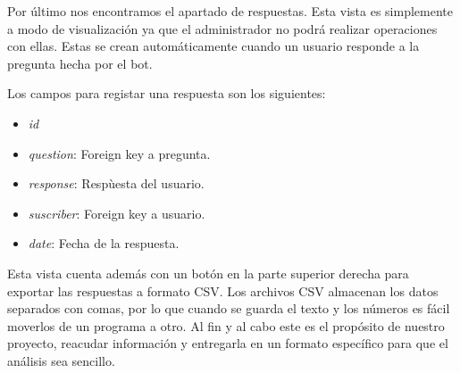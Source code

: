 Por último nos encontramos el apartado de respuestas. Esta vista es simplemente a modo de visualización ya que el administrador no podrá realizar operaciones con ellas. Estas se crean automáticamente cuando un usuario responde a la pregunta hecha por el bot. 

Los campos para registar una respuesta son los siguientes:

\begin{itemize}
    \item \textit{id}
    \item \textit{question}: Foreign key a pregunta.
    \item \textit{response}: Respùesta del usuario.
    \item \textit{suscriber}: Foreign key a usuario.
    \item \textit{date}: Fecha de la respuesta.
\end{itemize}

Esta vista cuenta además con un botón en la parte superior derecha para exportar las respuestas a formato CSV. Los archivos CSV almacenan los datos separados con comas, por lo que cuando se guarda el texto y los números es fácil moverlos de un programa a otro. Al fin y al cabo este es el propósito de nuestro proyecto, reacudar información y entregarla en un formato específico para que el análisis sea sencillo.